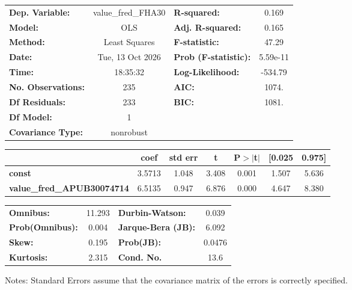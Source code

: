 \begin{center}
\begin{tabular}{lclc}
\toprule
\textbf{Dep. Variable:}            & value\_fred\_FHA30 & \textbf{  R-squared:         } &     0.169   \\
\textbf{Model:}                    &        OLS         & \textbf{  Adj. R-squared:    } &     0.165   \\
\textbf{Method:}                   &   Least Squares    & \textbf{  F-statistic:       } &     47.29   \\
\textbf{Date:}                     &  Tue, 13 Oct 2026  & \textbf{  Prob (F-statistic):} &  5.59e-11   \\
\textbf{Time:}                     &      18:35:32      & \textbf{  Log-Likelihood:    } &   -534.79   \\
\textbf{No. Observations:}         &          235       & \textbf{  AIC:               } &     1074.   \\
\textbf{Df Residuals:}             &          233       & \textbf{  BIC:               } &     1081.   \\
\textbf{Df Model:}                 &            1       & \textbf{                     } &             \\
\textbf{Covariance Type:}          &     nonrobust      & \textbf{                     } &             \\
\bottomrule
\end{tabular}
\begin{tabular}{lcccccc}
                                   & \textbf{coef} & \textbf{std err} & \textbf{t} & \textbf{P$> |$t$|$} & \textbf{[0.025} & \textbf{0.975]}  \\
\midrule
\textbf{const}                     &       3.5713  &        1.048     &     3.408  &         0.001        &        1.507    &        5.636     \\
\textbf{value\_fred\_APUB30074714} &       6.5135  &        0.947     &     6.876  &         0.000        &        4.647    &        8.380     \\
\bottomrule
\end{tabular}
\begin{tabular}{lclc}
\textbf{Omnibus:}       & 11.293 & \textbf{  Durbin-Watson:     } &    0.039  \\
\textbf{Prob(Omnibus):} &  0.004 & \textbf{  Jarque-Bera (JB):  } &    6.092  \\
\textbf{Skew:}          &  0.195 & \textbf{  Prob(JB):          } &   0.0476  \\
\textbf{Kurtosis:}      &  2.315 & \textbf{  Cond. No.          } &     13.6  \\
\bottomrule
\end{tabular}
\end{center}

Notes: \newline
 [1] Standard Errors assume that the covariance matrix of the errors is correctly specified.